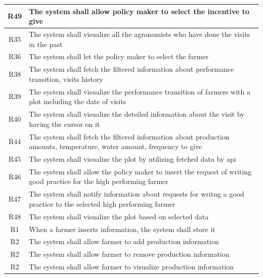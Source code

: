 \begin{center}
\begin{longtable}{|c|m{}|}
            \textsc{R49}  &    The system shall allow policy maker to select the incentive to give \\
            \hline
            \textsc{R35}  &    The system shall visualize all the agronomists who have done the visits in the past \\
            \hline
            \textsc{R36}  &    The system shall let the policy maker to select the farmer  \\
            \hline
            \textsc{R38}  &    The system shall fetch the filtered information about performance transition, visits history  \\
            \hline
            \textsc{R39}  &    The system shall visualize the performance transition of farmers with a plot including the date of visits  \\
            \hline
            \textsc{R40}  &    The system shall visualize the deteiled information about the visit by having  the cursor on it  \\
            \hline
            \textsc{R44}  &    The system shall fetch the filtered information about production amounts, temperature, water amount, frequency to give  \\
            \hline
            \textsc{R45}  &    The system shall visualize the plot by utilizing fetched data by api  \\
            \hline
            \textsc{R46}  &    The system shall allow the policy maker to insert the request of writing good practice for the high performing farmer  \\
            \hline
            \textsc{R47}  &    The system shall notify information about requests for writng a good practice to the selected high performing farmer  \\
            \hline
            \textsc{R48}  &    The system shall visualize the plot based on selected data  \\
            \hline
            \hline
            \hline
            \textsc{R1}  &    When a farmer inserts information, the system shall store it  \\
            \hline
            \textsc{R2}  &    The system shall allow farmer to add production information  \\
            \textsc{R2}  &    The system shall allow farmer to remove production information  \\
            \textsc{R2}  &    The system shall allow farmer to visualize production information  \\

\end{longtable}
\end{center}
